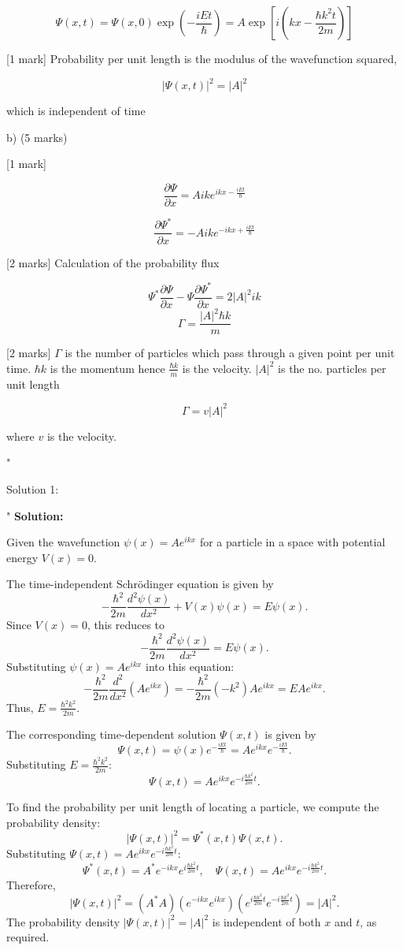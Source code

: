 \[ \Psi(x,t) = \Psi(x,0) \exp(- \frac{iEt}{\hbar}) =  A \exp\left[ i \left( kx - \frac{\hbar k^2 t}{2m} \right) \right] \]

[1 mark] Probability per unit length is the modulus of the wavefunction squared,

\[ |\Psi(x,t)|^2 = |A|^2 \]

which is independent of time

b) (5 marks)

[1 mark] 

\[ \frac{\partial \Psi}{\partial x} = Aik e^{ikx - \frac{iEt}{\hbar}} \] 

\[ \frac{\partial \Psi^{*}}{\partial x} = -Aik e^{-ikx + \frac{iEt}{\hbar}} \] 

[2 marks] Calculation of the probability flux

\[\Psi^{*}\frac{\partial \Psi}{\partial x} - \Psi\frac{\partial \Psi^{*}}{\partial x} = 2|A|^{2}ik\]
\[\Gamma = \frac{\left|A \right|^{2}\hbar k}{m} \]  

[2 marks] \( \Gamma \) is the number of particles which pass through a given point per unit time. \( \hbar k \) is the momentum hence \( \frac{\hbar k }{m} \) is the velocity.  \( |A|^2 \) is the no. particles per unit length

 \[\Gamma = v \left|A \right|^{2} \]  

where \(v\) is the velocity. 

"

Solution 1: 

"
\textbf{Solution:}  

Given the wavefunction $\psi(x) = A e^{ikx}$ for a particle in a space with potential energy $V(x) = 0$.  

The time-independent Schrödinger equation is given by  
\[
-\frac{\hbar^2}{2m} \frac{d^2 \psi(x)}{dx^2} + V(x)\psi(x) = E\psi(x).
\]  
Since $V(x) = 0$, this reduces to  
\[
-\frac{\hbar^2}{2m} \frac{d^2 \psi(x)}{dx^2} = E\psi(x).
\]  
Substituting $\psi(x) = A e^{ikx}$ into this equation:  
\[
-\frac{\hbar^2}{2m} \frac{d^2}{dx^2}\left(A e^{ikx}\right) = -\frac{\hbar^2}{2m}(-k^2)A e^{ikx} = E A e^{ikx}.
\]  
Thus, $E = \frac{\hbar^2 k^2}{2m}$.  

The corresponding time-dependent solution $\Psi(x,t)$ is given by  
\[
\Psi(x,t) = \psi(x) e^{-\frac{iEt}{\hbar}} = A e^{ikx} e^{-\frac{iEt}{\hbar}}.
\]  
Substituting $E = \frac{\hbar^2 k^2}{2m}$:  
\[
\Psi(x,t) = A e^{ikx} e^{-i \frac{\hbar k^2}{2m} t}.
\]  

To find the probability per unit length of locating a particle, we compute the probability density:  
\[
|\Psi(x,t)|^2 = \Psi^*(x,t) \Psi(x,t).
\]  
Substituting $\Psi(x,t) = A e^{ikx} e^{-i \frac{\hbar k^2}{2m} t}$:  
\[
\Psi^*(x,t) = A^* e^{-ikx} e^{i \frac{\hbar k^2}{2m} t}, \quad \Psi(x,t) = A e^{ikx} e^{-i \frac{\hbar k^2}{2m} t}.
\]  
Therefore,  
\[
|\Psi(x,t)|^2 = \left(A^* A\right) \left(e^{-ikx} e^{ikx}\right) \left(e^{i \frac{\hbar k^2}{2m} t} e^{-i \frac{\hbar k^2}{2m} t}\right) = |A|^2.
\]  
The probability density $|\Psi(x,t)|^2 = |A|^2$ is independent of both $x$ and $t$, as required.  

